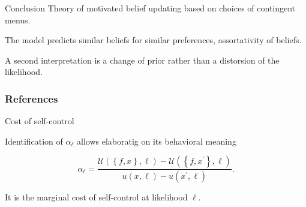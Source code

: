 \documentclass[usenames,dvipsnames,aspectratio=169,11pt, envcountsect]{beamer}
\begin{document}
\begin{comment}
	\begin{equation}
		\begin{aligned}
			\mathcal{U} \left(M ; \ell \left( M_{F} \right) \right) = & \max _{f \in M}\left\{\int_{M_F} u \left( f \left( s \right), \ell \left( M_{F} \right) \right) d p\left(\cdot \mid \ell \left(M_F \right) \right) \right.                \\
			                                                          & \left. +\alpha _{\ell_{M_F}} \int_{M_F} u \left( f \left(s \right) ,  \ell^{\prime}_{M_F} \right) d p\left(\cdot \mid \ell^{\prime}_{M_F} \right)\right\}                 \\
			                                                          & -\max _{f^{\prime} \in M} \alpha _{\ell_{M_F}} \int_{M_F} u\left(f^{\prime}\left(s \right) , \ell^{\prime}_{M_F} \right) d p\left(\cdot \mid \ell^{\prime}_{M_F}\right) .
		\end{aligned} \tag{2}
	\end{equation}

\end{frame}

\end{comment}

\begin{frame}{Conclusion}
	Theory of motivated belief updating based on choices of contingent menus.

	\vfill

	The model predicts similar beliefs for similar preferences, assortativity of beliefs.

	\vfill

	A second interpretation is a change of prior rather than a distorsion of the likelihood.

\end{frame}

\begin{frame}

	\frametitle{References}

	
	


\end{frame}

\appendix

\begin{frame}{Cost of self-control}

	Identification of \( \alpha_{\ell} \) allows elaboratig on its behavioral meaning

	\vfill

	\[
		\alpha_{\ell} = \frac{\mathcal{U} \left( \left\{f, x \right\}, \ell \right) - \mathcal{U} \left( \left\{f, x^{\prime} \right\}, \ell \right) }{u \left( x , \ell \right) - u \left( x^{\prime} , \ell \right)} .
	\]

	\vfill

	It is the marginal cost of self-control at likelihood \( \ell \).

\end{frame}
\end{document}
